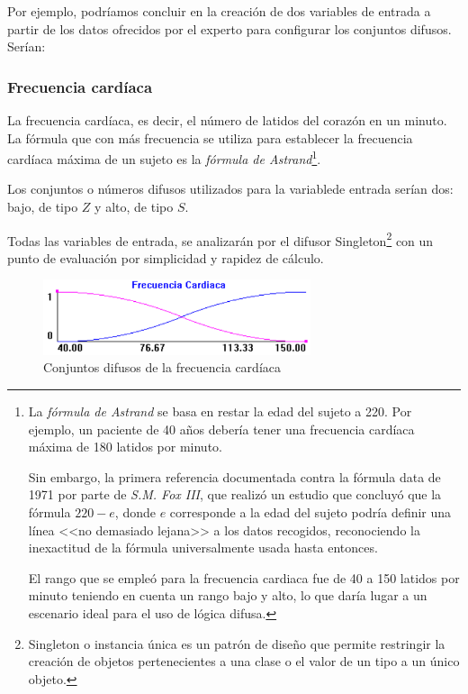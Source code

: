 \documentclass[a4paper, 11pt, titlepage]{article}
\begin{document}
        Por ejemplo, podríamos concluir en la creación de dos variables de entrada a partir de los datos 
        ofrecidos por el experto para configurar los conjuntos difusos. Serían:

        \subsubsection{Frecuencia cardíaca} 
        
        La frecuencia cardíaca, es decir, el número de latidos del corazón 
        en un minuto. La fórmula que con más frecuencia se utiliza para establecer la frecuencia cardíaca 
        máxima de un sujeto es la \textit{fórmula de Astrand}\footnote{
            La \textit{fórmula de Astrand} se basa en restar la edad del sujeto a 220. Por ejemplo, un 
            paciente de 40 años debería tener una frecuencia cardíaca máxima de 180 latidos por minuto.

            Sin embargo, la primera referencia documentada contra la fórmula data de 1971 por parte de 
            \textit{S.M. Fox III}, que realizó un estudio que concluyó que la fórmula $220-e$, donde $e$ 
            corresponde a la edad del sujeto podría definir una línea <<no demasiado lejana>> a los datos 
            recogidos, reconociendo la inexactitud de la fórmula universalmente usada hasta entonces. 
            
            El rango que se empleó para la frecuencia cardiaca fue de 40 a 150 latidos  
            por minuto teniendo en cuenta un rango bajo y alto, lo que daría lugar a un escenario ideal para el 
            uso de lógica difusa.
        }.

        Los conjuntos o números difusos utilizados para la variablede entrada serían dos: bajo, de tipo $Z$ y 
        alto, de tipo $S$. 

        Todas las variables de entrada, se analizarán por el difusor Singleton\footnote{
            Singleton o instancia única es un patrón de diseño que permite restringir la creación de objetos 
            pertenecientes a una clase o el valor de un tipo a un único objeto.
        } con un punto de evaluación por 
        simplicidad y rapidez de cálculo.

        \begin{figure}[htp]
            \centering
            \includegraphics[width=0.7\textwidth]{resources/frecuenciacardiaca.png}
            \caption{Conjuntos difusos de la frecuencia cardíaca}
            \label{frecuenciacardiaca}
        \end{figure}
    
\end{document}
